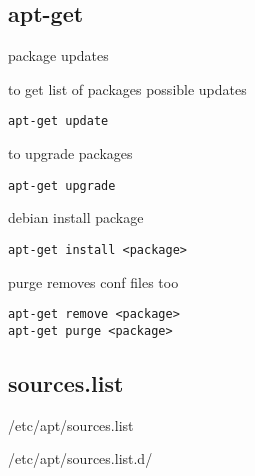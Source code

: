 
\subsection{apt-get}

package updates

to get list of packages possible updates

\begin{verbatim}
apt-get update
\end{verbatim}

to upgrade packages
\begin{verbatim}
apt-get upgrade
\end{verbatim}

debian install package

\begin{verbatim}
apt-get install <package>
\end{verbatim}

purge removes conf files too
\begin{verbatim}
apt-get remove <package>
apt-get purge <package>
\end{verbatim}

\subsection{sources.list}

/etc/apt/sources.list

/etc/apt/sources.list.d/


